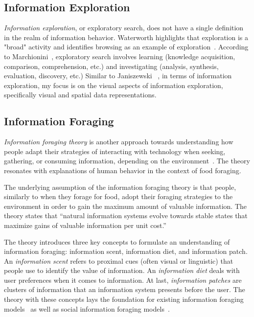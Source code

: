 {{\subsection{Information Exploration}
\textit{Information exploration}, or exploratory search, does not have a single definition in the realm of information behavior. Waterworth highlights that exploration is a "broad" activity and identifies browsing as an example of exploration~\cite{waterworth1991model}. According to Marchionini~\cite{marchionini2006exploratory}, exploratory search involves learning (knowledge acquisition, comparison, comprehension, etc.) and investigating (analysis, synthesis, evaluation, discovery, etc.) Similar to Janiszewski ~\cite{janiszewski1998influence}, in terms of information exploration, my focus is on the visual aspects of information exploration, specifically visual and spatial data representations.
}
{\subsection{Information Foraging}
\textit{Information foraging theory} is another approach towards understanding how people adapt their strategies of interacting with technology when seeking, gathering, or consuming information, depending on the environment~\cite{pirolli1999information}. The theory resonates with explanations of human behavior in the context of food foraging. 

The underlying assumption of the information foraging theory is that people, similarly to when they forage for food, adopt their foraging strategies to the environment in order to gain the maximum amount of valuable information. The theory states that ``natural information systems evolve towards stable states that maximize gains of valuable information per unit cost.''

The theory introduces three key concepts to formulate an understanding of information foraging: information scent, information diet, and information patch. An \textit{information scent} refers to proximal cues (often visual or linguistic) that people use to identify the value of information. An \textit{information diet} deals with user preferences when it comes to information. At last, \textit{information patches} are clusters of information that an information system presents before the user. The theory with these concepts lays the foundation for existing information foraging models~\cite{fu2007snif,kitajima2000comprehension} as well as social information foraging models~\cite{pirolli2009elementary,fu2008microstructures}.  
}

}
